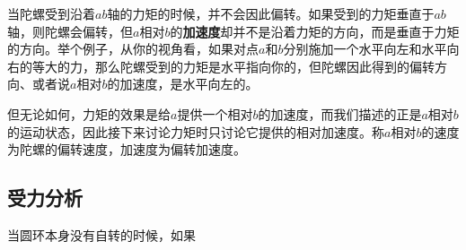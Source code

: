 当陀螺受到沿着$ab$轴的力矩的时候，并不会因此偏转。如果受到的力矩垂直于$ab$轴，则陀螺会偏转，但$a$相对$b$的\textbf{加速度}却并不是沿着力矩的方向，而是垂直于力矩的方向。举个例子，从你的视角看，如果对点$a$和$b$分别施加一个水平向左和水平向右的等大的力，那么陀螺受到的力矩是水平指向你的，但陀螺因此得到的偏转方向、或者说$a$相对$b$的加速度，是水平向左的。



但无论如何，力矩的效果是给$a$提供一个相对$b$的加速度，而我们描述的正是$a$相对$b$的运动状态，因此接下来讨论力矩时只讨论它提供的相对加速度。称$a$相对$b$的速度为陀螺的偏转速度，加速度为偏转加速度。




\subsection{受力分析}



当圆环本身没有自转的时候，如果




























